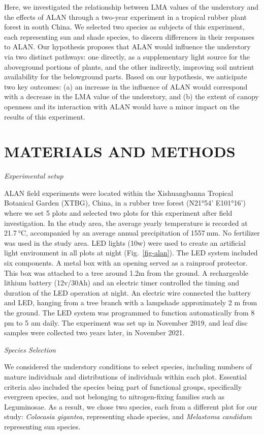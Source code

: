 \documentclass[
  12pt,
  letterpaper,
  DIV=11,
  numbers=noendperiod]{scrartcl}
\begin{document}
Here, we investigated the relationship between LMA values of the
understory and the effects of ALAN through a two-year experiment in a
tropical rubber plant forest in south China. We selected two species as
subjects of this experiment, each representing sun and shade species, to
discern differences in their responses to ALAN. Our hypothesis proposes
that ALAN would influence the understory via two distinct pathways: one
directly, as a supplementary light source for the aboveground portions
of plants, and the other indirectly, improving soil nutrient
availability for the belowground parts. Based on our hypothesis, we
anticipate two key outcomes: (a) an increase in the influence of ALAN
would correspond with a decrease in the LMA value of the understory, and
(b) the extent of canopy openness and its interaction with ALAN would
have a minor impact on the results of this experiment.

\hypertarget{materials-and-methods}{%
\section{MATERIALS AND METHODS}\label{materials-and-methods}}

\emph{Experimental setup}

ALAN field experiments were located within the Xishuangbanna Tropical
Botanical Garden (XTBG), China, in a rubber tree forest (N21°54'
E101°16') where we set 5 plots and selected two plots for this
experiment after field investigation. In the study area, the average
yearly temperature is recorded at 21.7 °C, accompanied by an average
annual precipitation of 1557 mm. No fertilizer was used in the study
area. LED lights (10w) were used to create an artificial light
environment in all plots at night (Fig.~\ref{fig-alan}). The LED system
included six components. A metal box with an opening served as a
rainproof protector. This box was attached to a tree around 1.2m from
the ground. A rechargeable lithium battery (12v/30Ah) and an electric
timer controlled the timing and duration of the LED operation at night.
An electric wire connected the battery and LED, hanging from a tree
branch with a lampshade approximately 2 m from the ground. The LED
system was programmed to function automatically from 8 pm to 5 am daily.
The experiment was set up in November 2019, and leaf disc samples were
collected two years later, in November 2021.

\emph{Species Selection}

We considered the understory conditions to select species, including
numbers of mature individuals and distributions of individuals within
each plot. Essential criteria also included the species being part of
functional groups, specifically evergreen species, and not belonging to
nitrogen-fixing families such as Leguminosae. As a result, we chose two
species, each from a different plot for our study: \emph{Colocasia
gigantea}, representing shade species, and \emph{Melastoma candidum}
representing sun species.
\end{document}
